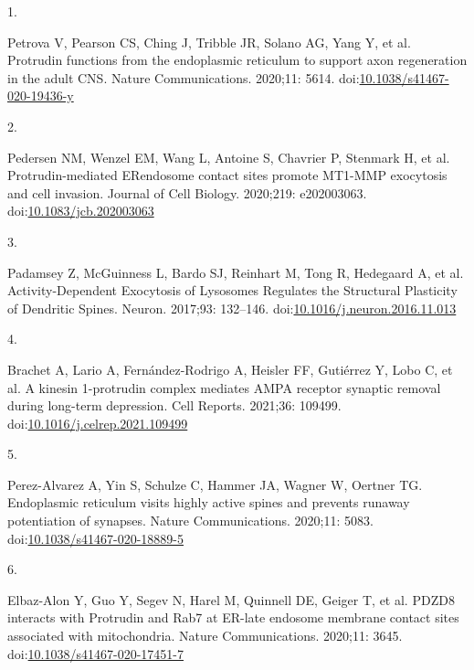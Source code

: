 \documentclass[
  12pt,
  a4paper,
]{article}
\newlength{\cslhangindent}
\newlength{\csllabelwidth}
\newlength{\cslentryspacingunit} %
\newenvironment{CSLReferences}[2] %
 {%
  \setlength{\parindent}{0pt}
  \ifodd #1
  \let\oldpar\par
  \def\par{\hangindent=\cslhangindent\oldpar}
  \fi
  \setlength{\parskip}{#2\cslentryspacingunit}
 }%
 {}
\newcommand{\CSLLeftMargin}[1]{\parbox[t]{\csllabelwidth}{#1}}
\newcommand{\CSLRightInline}[1]{\parbox[t]{\linewidth - \csllabelwidth}{#1}\break}
\begin{document}
\hypertarget{refs}{}
\begin{CSLReferences}{0}{0}
\leavevmode{}%
\CSLLeftMargin{1. }%
\CSLRightInline{Petrova V, Pearson CS, Ching J, Tribble JR, Solano AG,
Yang Y, et al. Protrudin functions from the endoplasmic reticulum to
support axon regeneration in the adult {CNS}. Nature Communications.
2020;11: 5614.
doi:\href{https://doi.org/10.1038/s41467-020-19436-y}{10.1038/s41467-020-19436-y}}

\leavevmode{}%
\CSLLeftMargin{2. }%
\CSLRightInline{Pedersen NM, Wenzel EM, Wang L, Antoine S, Chavrier P,
Stenmark H, et al. Protrudin-mediated {ER}\textendash endosome contact
sites promote {MT1-MMP} exocytosis and cell invasion. Journal of Cell
Biology. 2020;219: e202003063.
doi:\href{https://doi.org/10.1083/jcb.202003063}{10.1083/jcb.202003063}}

\leavevmode{}%
\CSLLeftMargin{3. }%
\CSLRightInline{Padamsey Z, McGuinness L, Bardo SJ, Reinhart M, Tong R,
Hedegaard A, et al. Activity-{Dependent Exocytosis} of {Lysosomes
Regulates} the {Structural Plasticity} of {Dendritic Spines}. Neuron.
2017;93: 132--146.
doi:\href{https://doi.org/10.1016/j.neuron.2016.11.013}{10.1016/j.neuron.2016.11.013}}

\leavevmode{}%
\CSLLeftMargin{4. }%
\CSLRightInline{Brachet A, Lario A, Fernández-Rodrigo A, Heisler FF,
Gutiérrez Y, Lobo C, et al. A kinesin 1-protrudin complex mediates
{AMPA} receptor synaptic removal during long-term depression. Cell
Reports. 2021;36: 109499.
doi:\href{https://doi.org/10.1016/j.celrep.2021.109499}{10.1016/j.celrep.2021.109499}}

\leavevmode{}%
\CSLLeftMargin{5. }%
\CSLRightInline{Perez-Alvarez A, Yin S, Schulze C, Hammer JA, Wagner W,
Oertner TG. Endoplasmic reticulum visits highly active spines and
prevents runaway potentiation of synapses. Nature Communications.
2020;11: 5083.
doi:\href{https://doi.org/10.1038/s41467-020-18889-5}{10.1038/s41467-020-18889-5}}

\leavevmode{}%
\CSLLeftMargin{6. }%
\CSLRightInline{Elbaz-Alon Y, Guo Y, Segev N, Harel M, Quinnell DE,
Geiger T, et al. {PDZD8} interacts with {Protrudin} and {Rab7} at
{ER-late} endosome membrane contact sites associated with mitochondria.
Nature Communications. 2020;11: 3645.
doi:\href{https://doi.org/10.1038/s41467-020-17451-7}{10.1038/s41467-020-17451-7}}


\end{CSLReferences}
\end{document}
